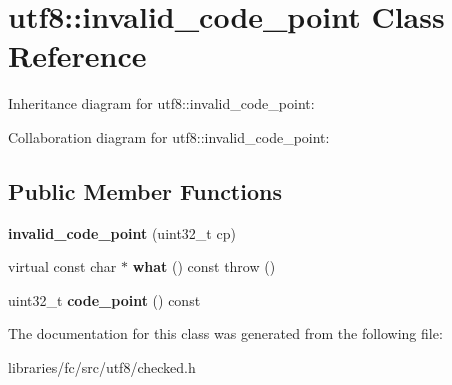 \hypertarget{classutf8_1_1invalid__code__point}{}\section{utf8\+:\+:invalid\+\_\+code\+\_\+point Class Reference}
\label{classutf8_1_1invalid__code__point}


Inheritance diagram for utf8\+:\+:invalid\+\_\+code\+\_\+point\+:


Collaboration diagram for utf8\+:\+:invalid\+\_\+code\+\_\+point\+:
\subsection*{Public Member Functions}
\begin{DoxyCompactItemize}
\item 
\mbox{\label{classutf8_1_1invalid__code__point_a46f27dd1c5b286936ec58baca3ca6220}} 
{\bfseries invalid\+\_\+code\+\_\+point} (uint32\+\_\+t cp)
\item 
\mbox{\label{classutf8_1_1invalid__code__point_ab0c8da05711bbc7c540ba8405e7ba707}} 
virtual const char $\ast$ {\bfseries what} () const  throw ()
\item 
\mbox{\label{classutf8_1_1invalid__code__point_a005173216436fa8403999b9ce8f83eb8}} 
uint32\+\_\+t {\bfseries code\+\_\+point} () const
\end{DoxyCompactItemize}


The documentation for this class was generated from the following file\+:\begin{DoxyCompactItemize}
\item 
libraries/fc/src/utf8/checked.\+h\end{DoxyCompactItemize}
